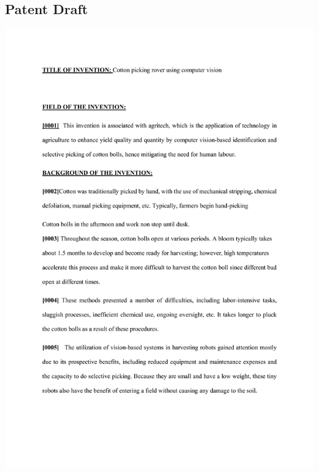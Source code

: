 \documentclass[12pt,a4paper]{report}
\begin{document}
\subsection {Patent Draft}
\includegraphics[scale =0.7]{images/patent/patent_doc/output-0000.jpg}
\newpage
\end{document}
